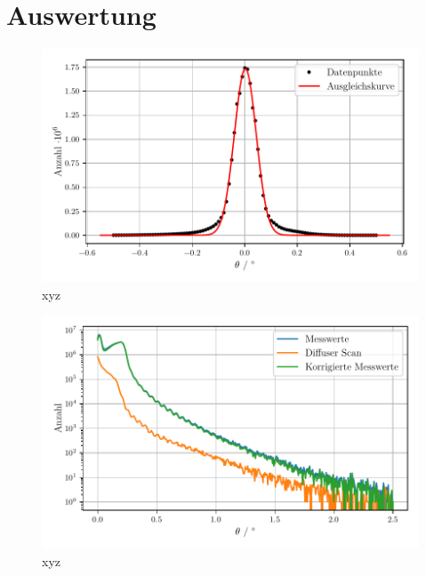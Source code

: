 \section{Auswertung}
\label{sec:Auswertung}

\begin{figure}
    \centering
    \includegraphics[width=\textwidth]{figures/detector_scan.pdf}
    \caption{xyz}
    \label{abb:t1}
\end{figure}

\begin{figure}
    \centering
    \includegraphics[width=\textwidth]{figures/messwerte_relativ.pdf}
    \caption{xyz}
    \label{abb:t1}
\end{figure}